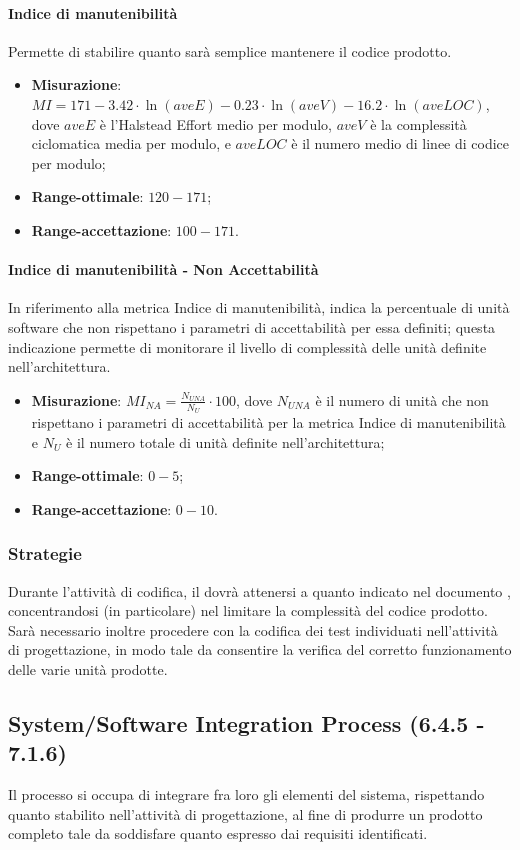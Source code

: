 \paragraph{Indice di manutenibilità}
\label{indMan}
Permette di stabilire quanto sarà semplice mantenere il codice prodotto.
\begin{itemize}
\item \textbf{Misurazione}: $MI = 171 - 3.42 \cdot \ln(aveE) - 0.23 \cdot \ln(aveV) - 16.2 \cdot \ln(aveLOC)$, dove $aveE$ è l'Halstead Effort medio per modulo, $aveV$ è la complessità ciclomatica media per modulo, e $aveLOC$ è il numero medio di linee di codice per modulo;
\item \textbf{Range-ottimale}: $120 - 171$;
\item \textbf{Range-accettazione}: $100 - 171$.
\end{itemize}
\paragraph{Indice di manutenibilità - Non Accettabilità}
\label{indManNA}
In riferimento alla metrica Indice di manutenibilità, indica la percentuale di unità software che non rispettano i parametri di accettabilità per essa definiti; questa indicazione permette di monitorare il livello di complessità delle unità definite nell'architettura.
\begin{itemize}
\item \textbf{Misurazione}: $MI_{NA}=\frac{N_{UNA}}{N_{U}} \cdot 100$, dove $N_{UNA}$ è il numero di unità che non rispettano i parametri di accettabilità per la metrica Indice di manutenibilità e $N_{U}$ è il numero totale di unità definite nell'architettura;
\item \textbf{Range-ottimale}: $0 - 5$;
\item \textbf{Range-accettazione}: $0 - 10$.
\end{itemize}
\subsubsection{Strategie}
Durante l'attività di codifica, il \textit{\Progr} dovrà attenersi a quanto indicato nel documento \textit{\DDP}, concentrandosi (in particolare) nel limitare la complessità del codice prodotto.\\
Sarà necessario inoltre procedere con la codifica dei test individuati nell'attività di progettazione, in modo tale da consentire la verifica del corretto funzionamento delle varie unità prodotte.
\subsection{System/Software Integration Process (6.4.5 - 7.1.6)}
\label{sySoIntegration}
Il processo si occupa di integrare fra loro gli elementi del sistema, rispettando quanto stabilito nell'attività di progettazione, al fine di produrre un prodotto completo tale da soddisfare quanto espresso dai requisiti identificati.
